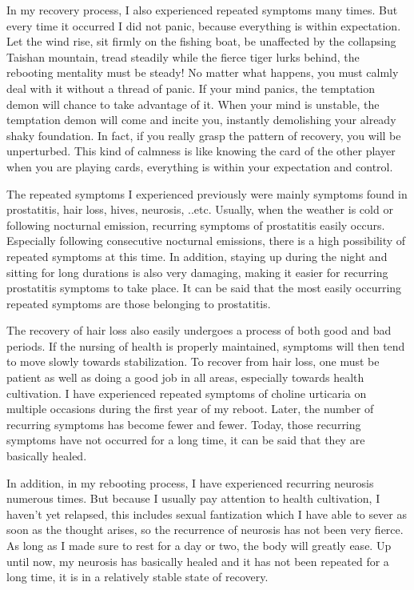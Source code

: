 \documentclass[
]{book}
\begin{document}
In my recovery process, I also experienced repeated symptoms many times. But every time it occurred I did not panic, because everything is within expectation. Let the wind rise, sit firmly on the fishing boat, be unaffected by the collapsing Taishan mountain, tread steadily while the fierce tiger lurks behind, the rebooting mentality must be steady! No matter what happens, you must calmly deal with it without a thread of panic. If your mind panics, the temptation demon will chance to take advantage of it. When your mind is unstable, the temptation demon will come and incite you, instantly demolishing your already shaky foundation. In fact, if you really grasp the pattern
of recovery, you will be unperturbed. This kind of calmness is like knowing the card of the other player when you are playing cards, everything is within your expectation and control.

The repeated symptoms I experienced previously were mainly symptoms found in prostatitis, hair loss, hives, neurosis, ..etc. Usually, when the weather is cold or following nocturnal emission, recurring symptoms of prostatitis easily occurs. Especially following consecutive nocturnal emissions, there is a high possibility of repeated symptoms at this time. In addition, staying up during the night and sitting for long durations is also very damaging, making it easier for recurring prostatitis symptoms to take place. It can be said that the most easily occurring repeated symptoms are those belonging to prostatitis.

The recovery of hair loss also easily undergoes a process of both good and bad periods. If the nursing of health is properly maintained, symptoms will then tend to move slowly towards stabilization. To recover from hair loss, one must be patient as well as doing a good job in all areas, especially towards health cultivation. I have experienced repeated symptoms of choline urticaria on multiple occasions during the first year of my reboot. Later, the number of recurring symptoms has become fewer and fewer. Today, those recurring symptoms have not occurred for a long time, it can be said that they are basically healed.

In addition, in my rebooting process, I have experienced recurring neurosis numerous times. But because I usually pay attention to health cultivation, I haven't yet relapsed, this includes sexual fantization which I have able to sever as soon as the thought arises, so the recurrence of neurosis has not been very fierce. As long as I made sure to rest for a day or two, the body will greatly ease. Up until now, my neurosis has basically healed and it has not been repeated for a long time, it is in a relatively stable state of recovery.
\end{document}
